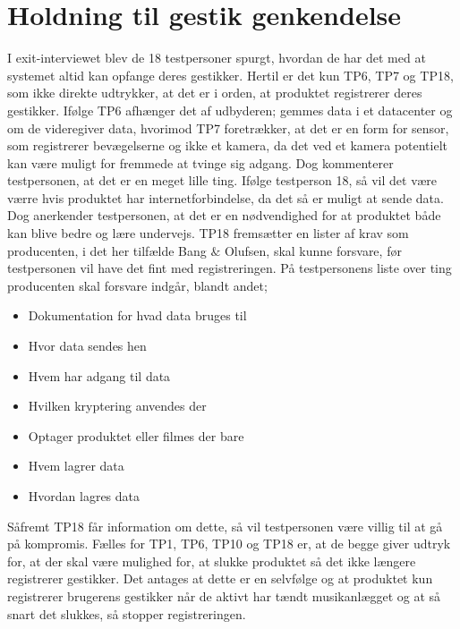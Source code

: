 \section{Holdning til gestik genkendelse}
\label{TestresultaterOvervaagning}
%
I exit-interviewet blev de 18 testpersoner spurgt, hvordan de har det med at systemet altid kan opfange deres gestikker. Hertil er det kun TP6, TP7 og TP18, som ikke direkte udtrykker, at det er i orden, at produktet registrerer deres gestikker. Ifølge TP6 afhænger det af udbyderen; gemmes data i et datacenter og om de videregiver data, hvorimod TP7 foretrækker, at det er en form for sensor, som registrerer bevægelserne og ikke et kamera, da det ved et kamera potentielt kan være muligt for fremmede at tvinge sig adgang. Dog kommenterer testpersonen, at det er en meget lille ting. Ifølge testperson 18, så vil det være værre hvis produktet har internetforbindelse, da det så er muligt at sende data. Dog anerkender testpersonen, at det er en nødvendighed for at produktet både kan blive bedre og lære undervejs. TP18 fremsætter en lister af krav som producenten, i det her tilfælde Bang $\&$ Olufsen, skal kunne forsvare, før testpersonen vil have det fint med registreringen. På testpersonens liste over ting producenten skal forsvare indgår, blandt andet;\blankline 
%
\begin{itemize}
  \item Dokumentation for hvad data bruges til
  \item Hvor data sendes hen
  \item Hvem har adgang til data
  \item Hvilken kryptering anvendes der
  \item Optager produktet eller filmes der bare
  \item Hvem lagrer data
  \item Hvordan lagres data\blankline
\end{itemize}
%
Såfremt TP18 får information om dette, så vil testpersonen være villig til at gå på kompromis. Fælles for TP1, TP6, TP10 og TP18 er, at de begge giver udtryk for, at der skal være mulighed for, at slukke produktet så det ikke længere registrerer gestikker. Det antages at dette er en selvfølge og at produktet kun registrerer brugerens gestikker når de aktivt har tændt musikanlægget og at så snart det slukkes, så stopper registreringen. 


